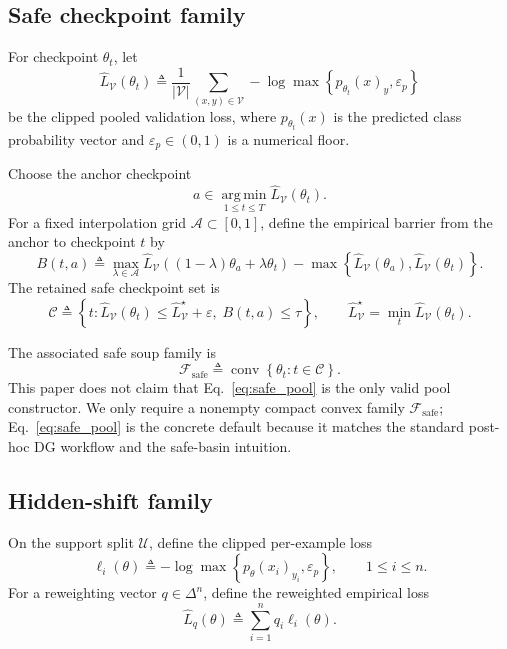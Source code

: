 \documentclass{article}
\newcommand{\cA}{\mathcal{A}}
\newcommand{\cC}{\mathcal{C}}
\newcommand{\cF}{\mathcal{F}}
\newcommand{\cU}{\mathcal{U}}
\newcommand{\cV}{\mathcal{V}}
\newcommand{\argmin}{\operatorname*{arg\,min}}
\newcommand{\conv}{\operatorname{conv}}
\newcommand{\simplex}{\Delta}
\newcommand{\loss}{\ell}
\newcommand{\paren}[1]{\left( #1 \right)}
\newcommand{\braces}[1]{\left\{ #1 \right\}}
\newcommand{\safe}{\mathrm{safe}}
\begin{document}
\subsection{Safe checkpoint family}

For checkpoint \(\theta_t\), let
\[
\widehat L_{\cV}(\theta_t)
\triangleq
\frac{1}{|\cV|}
\sum_{(x,y)\in\cV}
-\log \max\braces{p_{\theta_t}(x)_y,\varepsilon_p}
\]
be the clipped pooled validation loss, where \(p_{\theta_t}(x)\) is the predicted class probability vector and \(\varepsilon_p \in (0,1)\) is a numerical floor.

Choose the anchor checkpoint
\[
a \in \argmin_{1\le t\le T}\widehat L_{\cV}(\theta_t).
\]
For a fixed interpolation grid \(\cA \subset [0,1]\), define the empirical barrier from the anchor to checkpoint \(t\) by
\[
B(t,a)
\triangleq
\max_{\lambda\in\cA}
\widehat L_{\cV}\paren{(1-\lambda)\theta_a + \lambda \theta_t}
-
\max\braces{\widehat L_{\cV}(\theta_a), \widehat L_{\cV}(\theta_t)}.
\]
The retained safe checkpoint set is
\begin{equation}
\cC
\triangleq
\braces{
t :
\widehat L_{\cV}(\theta_t)\le \widehat L_{\cV}^\star + \varepsilon,
\;
B(t,a)\le \tau
},
\qquad
\widehat L_{\cV}^\star = \min_t \widehat L_{\cV}(\theta_t).
\label{eq:safe_pool}
\end{equation}

The associated safe soup family is
\begin{equation}
\cF_{\safe}
\triangleq
\conv\braces{\theta_t : t\in\cC}.
\label{eq:safe_family}
\end{equation}
This paper does not claim that Eq.~\eqref{eq:safe_pool} is the only valid pool constructor. We only require a nonempty compact convex family \(\cF_{\safe}\); Eq.~\eqref{eq:safe_pool} is the concrete default because it matches the standard post-hoc DG workflow and the safe-basin intuition.

\subsection{Hidden-shift family}

On the support split \(\cU\), define the clipped per-example loss
\[
\loss_i(\theta)
\triangleq
-\log \max\braces{p_{\theta}(x_i)_{y_i}, \varepsilon_p},
\qquad
1\le i\le n.
\]
For a reweighting vector \(q\in\simplex^n\), define the reweighted empirical loss
\begin{equation}
\widehat L_q(\theta)
\triangleq
\sum_{i=1}^{n} q_i \loss_i(\theta).
\label{eq:weighted_loss}
\end{equation}
\end{document}
